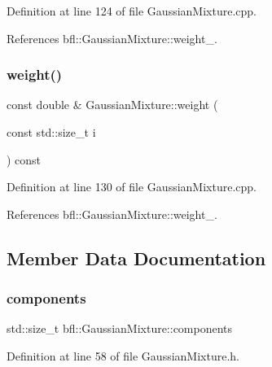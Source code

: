 Definition at line 124 of file Gaussian\+Mixture.\+cpp.



References bfl\+::\+Gaussian\+Mixture\+::weight\+\_\+.

\mbox{\label{classbfl_1_1GaussianMixture_a42672f88d9126f018715a4d258a57731}} 
\subsubsection{\texorpdfstring{weight()}{weight()}\hspace{0.1cm}{\footnotesize\ttfamily [4/4]}}
{\footnotesize\ttfamily const double \& Gaussian\+Mixture\+::weight (\begin{DoxyParamCaption}\item[{const std\+::size\+\_\+t}]{i }\end{DoxyParamCaption}) const\hspace{0.3cm}{\ttfamily [inherited]}}



Definition at line 130 of file Gaussian\+Mixture.\+cpp.



References bfl\+::\+Gaussian\+Mixture\+::weight\+\_\+.



\subsection{Member Data Documentation}
\mbox{\label{classbfl_1_1GaussianMixture_a02cc284327dbaa6b90c653dd2faccf88}} 
\subsubsection{\texorpdfstring{components}{components}}
{\footnotesize\ttfamily std\+::size\+\_\+t bfl\+::\+Gaussian\+Mixture\+::components\hspace{0.3cm}{\ttfamily [inherited]}}



Definition at line 58 of file Gaussian\+Mixture.\+h.



